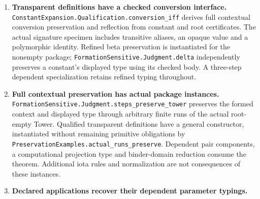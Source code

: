 \documentclass[11pt]{article}
\theoremstyle{definition}
\theoremstyle{remark}
\begin{document}
\begin{enumerate}
  \nolinkurl{StructuralConversionCode.Code.conversion_iff_checked} covers
  every original structural conversion when its root decoder is qualified.
  Actual finite root decoders instantiate it separately for MIL,
  List/identity and List/identity/mapRel, including arbitrary open terms, congruence under binders,
  symmetry and exact path composition. The executable checker uses the
  existing substitution and semantic level decision, not proof-side completed
  roots. \nolinkurl{NativeConversionChecking.checked_mil_step_preserves}
  retains each admitted source judgment through an accepted forward step.
  Checked conversion changes a displayed type only with independent target
  formation; a dependent identity example exercises both endpoints.
  Corruption controls separate rejected evidence, nonconversion and missing
  formation. Existence of accepted evidence is not a total conversion search,
  raw normalization, or qualification of a union of native packages.
  \nolinkurl{StructuralConversionCodeDependencies.Code.check_eq_of_agreeOnCheck}
  preserves both positive and negative verdicts from an executable comparison
  of the finite retained root requests. Used and unused branch-change controls
  distinguish proof-local reuse from whole-decoder agreement.
\item \textbf{Transparent definitions have a checked conversion interface.}
  \nolinkurl{ConstantExpansion.Qualification.conversion_iff} derives full
  contextual conversion preservation and reflection from constant and root
  certificates. The actual signature specimen includes transitive aliases,
  an opaque value and a polymorphic identity. Refined beta preservation is
  instantiated for the nonempty package; \nolinkurl{FormationSensitive.Judgment.delta}
  independently preserves a constant's displayed type using its checked body.
  A three-step dependent specialization retains refined typing throughout.
\item \textbf{Full contextual preservation has actual package instances.}
  \nolinkurl{FormationSensitive.Judgment.steps_preserve_tower} preserves the
  formed context and displayed type through arbitrary finite runs of the
  actual root-empty Tower. Qualified transparent definitions have a general
  constructor, instantiated without remaining primitive obligations by
  \nolinkurl{PreservationExamples.actual_runs_preserve}. Dependent pair
  components, a computational projection type and binder-domain reduction
  consume the theorem. Additional iota rules and normalization are not
  consequences of these instances.
\item \textbf{Declared applications recover their dependent parameter typings.}

\end{enumerate}
\end{document}
